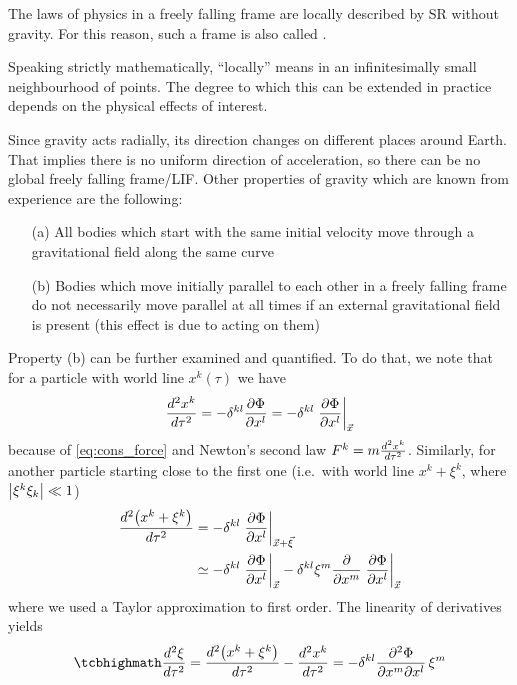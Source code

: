 \begin{prop}
The laws of physics in a freely falling frame are locally described by SR without gravity. For this reason, such a frame is also called .
\end{prop}
Speaking strictly mathematically, \enquote{locally} means in an infinitesimally small neighbourhood of points. The degree to which this can be extended in practice depends on the physical effects of interest.

Since gravity acts radially, its direction changes on different places around Earth. That implies there is no uniform direction of acceleration, so there can be no global freely falling frame/LIF. Other properties of gravity which are known from experience are the following:
\begin{itemize}
\item[(a)] All bodies which start with the same initial velocity move through a gravitational field along the same curve

\item[(b)] Bodies which move initially parallel to each other in a freely falling frame do not necessarily move parallel at all times if an external gravitational field is present (this effect is due to  acting on them)
\end{itemize}

Property (b) can be further examined and quantified. To do that, we note that for a particle with world line $x^k(\tau)$ we have
\begin{equation*}
\dv[2]{x^k}{\tau} = - \delta^{k l} \pdv{\Phi}{x^l} = - \delta^{k l} \eval{\pdv{\Phi}{x^l}}_{\vec{x}}
\end{equation*}
because of \eqref{eq:cons_force} and Newton's second law $F^k = m \dv[2]{x^k}{\tau}$. Similarly, for another particle starting close to the first one (i.e.~with world line $x^k + \xi^k$, where $\abs{\xi^k \xi_k} \ll 1$)
\begin{align*}
\dv[2]{\qty(x^k + \xi^k)}{\tau} &= - \delta^{k l} \eval{\pdv{\Phi}{x^l}}_{\vec{x} + \vec{\xi}}
\\
&\simeq - \delta^{k l} \eval{\pdv{\Phi}{x^l}}_{\vec{x}} - \delta^{k l} \xi^m \pdv{x^m} \eval{\pdv{\Phi}{x^l}}_{\vec{x}}
\end{align*}
where we used a Taylor approximation to first order. The linearity of derivatives yields
\begin{equation}\label{eq:tidal_newton}
\eqbox{
\dv[2]{\xi}{\tau} = \dv[2]{\qty(x^k + \xi^k)}{\tau} - \dv[2]{x^k}{\tau} = - \delta^{k l} \pdv[2]{\Phi}{x^m}{x^l} \, \xi^m
}
\end{equation}

